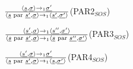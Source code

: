 		\item $\frac{\langle \underline{s}, \underline{\sigma} \rangle \rightarrow_1  \underline{\sigma'}}{\langle \underline{s} \text{ par }\underline{s'}, \underline{\sigma} \rangle \rightarrow_1 \langle \underline{s'}, \underline{\sigma'} \rangle}$(PAR2$_{SOS}$)
		\item $\frac{\langle \underline{s'}, \underline{\sigma} \rangle \rightarrow_1 \langle \underline{s''}, \underline{\sigma'} \rangle}{\langle \underline{s} \text{ par }\underline{s'}, \underline{\sigma} \rangle \rightarrow_1 \langle \underline{s} \text{ par }\underline{s''}, \underline{\sigma'} \rangle}$(PAR3$_{SOS}$)
		\item $\frac{\langle \underline{s'}, \underline{\sigma} \rangle \rightarrow_1  \underline{\sigma'}}{\langle \underline{s} \text{ par }\underline{s'}, \underline{\sigma} \rangle \rightarrow_1 \langle \underline{s}, \underline{\sigma'} \rangle}$(PAR4$_{SOS}$)
	\enumend
\enumend
